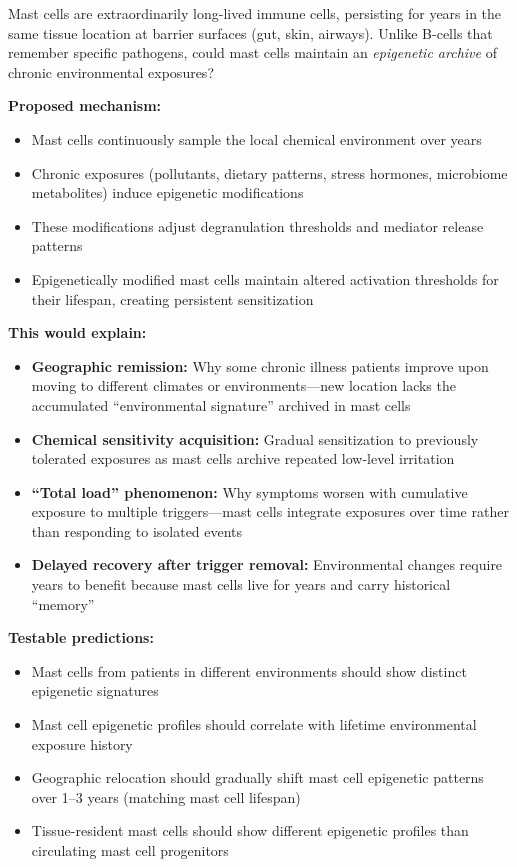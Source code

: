 \begin{open_question}
Mast cells are extraordinarily long-lived immune cells, persisting for years in the same tissue location at barrier surfaces (gut, skin, airways). Unlike B-cells that remember specific pathogens, could mast cells maintain an \textit{epigenetic archive} of chronic environmental exposures?

\textbf{Proposed mechanism:}
\begin{itemize}
    \item Mast cells continuously sample the local chemical environment over years
    \item Chronic exposures (pollutants, dietary patterns, stress hormones, microbiome metabolites) induce epigenetic modifications
    \item These modifications adjust degranulation thresholds and mediator release patterns
    \item Epigenetically modified mast cells maintain altered activation thresholds for their lifespan, creating persistent sensitization
\end{itemize}

\textbf{This would explain:}
\begin{itemize}
    \item \textbf{Geographic remission:} Why some chronic illness patients improve upon moving to different climates or environments---new location lacks the accumulated ``environmental signature'' archived in mast cells
    \item \textbf{Chemical sensitivity acquisition:} Gradual sensitization to previously tolerated exposures as mast cells archive repeated low-level irritation
    \item \textbf{``Total load'' phenomenon:} Why symptoms worsen with cumulative exposure to multiple triggers---mast cells integrate exposures over time rather than responding to isolated events
    \item \textbf{Delayed recovery after trigger removal:} Environmental changes require years to benefit because mast cells live for years and carry historical ``memory''
\end{itemize}

\textbf{Testable predictions:}
\begin{itemize}
    \item Mast cells from patients in different environments should show distinct epigenetic signatures
    \item Mast cell epigenetic profiles should correlate with lifetime environmental exposure history
    \item Geographic relocation should gradually shift mast cell epigenetic patterns over 1--3 years (matching mast cell lifespan)
    \item Tissue-resident mast cells should show different epigenetic profiles than circulating mast cell progenitors
\end{itemize}


\end{open_question}
